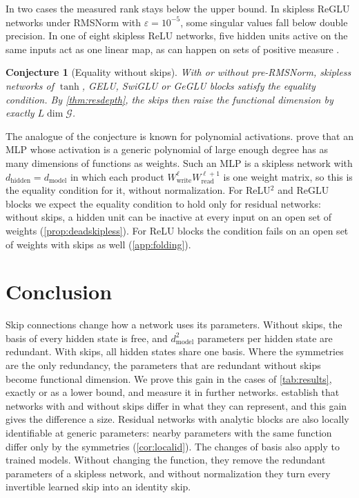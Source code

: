 \documentclass[10pt]{article}
\newtheorem{conjecture}{Conjecture}
\theoremstyle{definition}
\theoremstyle{remark}
\newcommand{\Wread}{W_{\mathrm{read}}}
\newcommand{\Wwrite}{W_{\mathrm{write}}}
\newcommand{\dm}{d_{\mathrm{model}}}
\newcommand{\dhid}{d_{\mathrm{hidden}}}
\newcommand{\G}{\mathcal{G}}
\begin{document}
In two cases the measured rank stays below the upper bound. In skipless ReGLU networks under RMSNorm with $\varepsilon = 10^{-5}$, some singular values fall below double precision. In one of eight skipless ReLU networks, five hidden units active on the same inputs act as one linear map, as can happen on sets of positive measure \citep{grigsby2023hidden}.

\begin{conjecture}[Equality without skips]\label{conj:equality}
With or without pre-RMSNorm, skipless networks of $\tanh$, GELU, SwiGLU or GeGLU blocks satisfy the equality condition. By \cref{thm:resdepth}, the skips then raise the functional dimension by exactly $L\dim\G$.
\end{conjecture}

The analogue of the conjecture is known for polynomial activations. \citet[Theorem~4.1]{shahverdi2026razor} prove that an MLP whose activation is a generic polynomial of large enough degree has as many dimensions of functions as weights. Such an MLP is a skipless network with $\dhid = \dm$ in which each product $\Wwrite^{\ell}\Wread^{\ell+1}$ is one weight matrix, so this is the equality condition for it, without normalization. For ReLU$^2$ and ReGLU blocks we expect the equality condition to hold only for residual networks: without skips, a hidden unit can be inactive at every input on an open set of weights (\cref{prop:deadskipless}). For ReLU blocks the condition fails on an open set of weights with skips as well (\cref{app:folding}).

\section{Conclusion}\label{sec:outlook}\label{sec:conclusion}

Skip connections change how a network uses its parameters. Without skips, the basis of every hidden state is free, and $\dm^2$ parameters per hidden state are redundant. With skips, all hidden states share one basis. Where the symmetries are the only redundancy, the parameters that are redundant without skips become functional dimension. We prove this gain in the cases of \cref{tab:results}, exactly or as a lower bound, and measure it in further networks. \citet{mijoski2026worth} establish that networks with and without skips differ in what they can represent, and this gain gives the difference a size. Residual networks with analytic blocks are also locally identifiable at generic parameters: nearby parameters with the same function differ only by the symmetries (\cref{cor:localid}). The changes of basis also apply to trained models. Without changing the function, they remove the redundant parameters of a skipless network, and without normalization they turn every invertible learned skip into an identity skip.
\end{document}
